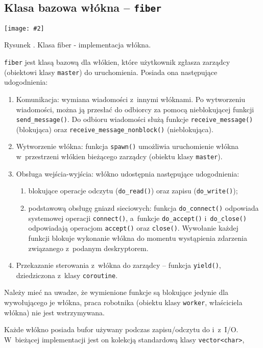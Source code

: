 \documentclass[12pt]{mwart}
\newcommand{\code}{\texttt}
\newcommand{\procbr}{()}
\newcommand{\function}[1]{\code{#1\procbr}}
\newcounter{figmain}
\newcommand{\myownfigure}[4]{ \newcounter{#1} \setcounter{#1}{\value{figmain}} \addtocounter{figmain}{1} \begin{center} \label{fig:#1} \centering \texttt{[image: \#2]}\\ \nopagebreak[5] \parbox[t]{11.5cm}{Rysunek \arabic{#1}. #3.} \end{center}}
\begin{document}
\subsection{Klasa bazowa włókna -- \code{fiber}}
\label{sec:fibers}
    \myownfigure{Fiber}{Fiber.png}{Klasa fiber - implementacja włókna}{.7}
%
\indent
  \code{fiber} jest klasą bazową dla włókien, które użytkownik zgłasza zarządcy (obiektowi klasy \code{master}) do uruchomienia.
  Posiada ona następujące udogodnienia:
  \begin{enumerate}
    \item Komunikacja: wymiana wiadomości z~innymi włóknami. Po wytworzeniu wiadomości, można ją przesłać do odbiorcy za pomocą nieblokującej funkcji \function{send\_message}.
    Do odbioru wiadomości służą funkcje \linebreak \function{receive\_message} (blokująca) oraz \function{receive\_message\_nonblock} (nieblokująca).
    \item Wytworzenie włókna: funkcja \function{spawn} umożliwia uruchomienie włókna w~przestrzeni włókien bieżącego zarządcy (obiektu klasy \code{master}).
    \item Obsługa wejścia-wyjścia: włókno udostępnia następujące udogodnienia:
      \begin{enumerate}
        \item blokujące operacje odczytu (\function{do\_read}) oraz zapisu (\function{do\_write});
        \item podstawową obsługę gniazd sieciowych: funkcja \function{do\_connect} odpowiada systemowej operacji \function{connect}, a~funkcje \function{do\_accept} 
          \linebreak i~\function{do\_close} odpowiadają operacjom \function{accept} oraz \function{close}. Wywołanie każdej funkcji blokuje wykonanie włókna do momentu wystąpienia  
          zdarzenia związanego z~podanym deskryptorem.
      \end{enumerate}
    \item Przekazanie sterowania z~włókna do zarządcy -- funkcja \function{yield}, dziedziczona z~klasy \code{coroutine}.
  \end{enumerate}
  Należy mieć na uwadze, że wymienione funkcje są blokujące jedynie dla wywołującego je włókna, praca robotnika (obiektu klasy \code{worker}, właściciela włókna) nie jest wstrzymywana.
\par
\indent
  Każde włókno posiada bufor używany podczas zapisu/odczytu do i~z~I/O. W~bieżącej implementacji jest on kolekcją standardową klasy \code{vector<char>},
\end{document}
